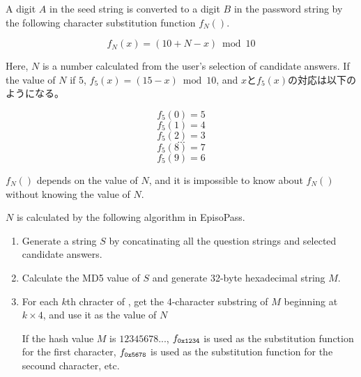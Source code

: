 \documentclass{article}
\begin{document}

A digit $A$ in the seed string is converted to a digit $B$
in the password string by the following
character substitution function $f_N()$.

\[ f_N(x) = (10 + N - x) \bmod 10 \]


Here, $N$ is a number calculated from the user's selection of
candidate answers.
If the value of $N$ if $5$, $f_5(x) = (15-x) \bmod 10$, and
$x$と$f_5(x)$の対応は以下のようになる。

\[ f_5(0) = 5 \]
\[ f_5(1) = 4 \]
\[ f_5(2) = 3 \]
\[ ... \]
\[ f_5(8) = 7 \]
\[ f_5(9) = 6 \]


$f_N()$ depends on the value of $N$, and
it is impossible to know about $f_N()$ without knowing the value of $N$.
 

$N$ is calculated by the following algorithm in EpisoPass.
 
\begin{enumerate}
  \item Generate a string $S$ by concatinating all the question strings and selected candidate answers.

  \item Calculate the MD5 value of $S$ and generate 32-byte hexadecimal string $M$.

  \item For each $k$th chracter of {\SS},
    get the 4-character substring of $M$ beginning at $k \times 4$, and use it as the value of $N$

    If the hash value $M$ is $12345678...$,
    $f_{\texttt{\scriptsize 0x1234}}$ is used as the substitution function for the first character,
    $f_{\texttt{\scriptsize 0x5678}}$ is used as the substitution function for the secound character, etc.
\end{enumerate}
\end{document}
